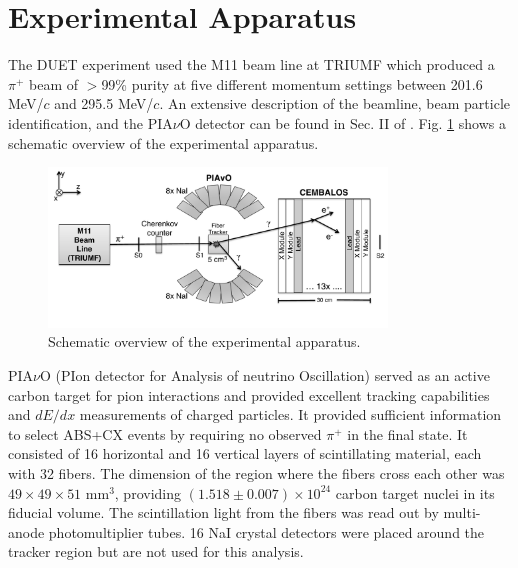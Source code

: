 \section{Experimental Apparatus}\label{sec:experiment}
The DUET experiment used the M11 beam line at TRIUMF which produced a $\pi^{+}$ beam of $>$99\% purity at five different momentum settings between 201.6 MeV/$c$ and 295.5 MeV/$c$. An extensive description of the beamline, beam particle identification, and the PIA$\nu$O detector can be found in Sec. II of \cite{duet}. Fig.  \ref{fig:config} shows a schematic overview of the experimental apparatus.

\begin{figure}[ht]
\includegraphics[width=90mm]{figures/duet_schematic_forpaper_v2.pdf}
\caption{Schematic overview of the experimental apparatus.}
\label{fig:config}
\end{figure}


PIA$\nu$O (PIon detector for Analysis of neutrino Oscillation) served as an active carbon target for pion interactions and  provided excellent tracking capabilities and $dE/dx$ measurements of charged particles. It provided sufficient information to select ABS+CX events by requiring no observed $\pi^{+}$ in the final state. It consisted of 16 horizontal and 16 vertical layers of scintillating material, each with 32 fibers. The dimension of the region where the fibers cross each other was {\color{red}$49\times49\times51$ mm$^3$}, providing $(1.518\pm0.007)\times10^{24}$ carbon target nuclei in its fiducial volume. The scintillation light from the fibers was read out by multi-anode photomultiplier tubes. 16 NaI crystal detectors were placed around the tracker region but are not used for this analysis.

